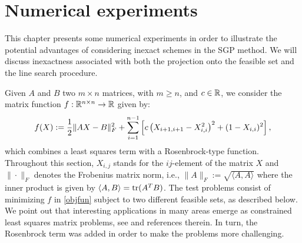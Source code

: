 \chapter{Numerical experiments} \label{chap:NumExp}
This chapter presents some numerical experiments in order to illustrate the potential advantages of considering inexact schemes in the SGP method.
We will discuss inexactness associated with both the projection onto the feasible set and the line search procedure.

Given $A$ and $B$ two $m\times n$ matrices, with $m\geq n$, and $c\in\mathbb{R}$, we consider the matrix function $f:\mathbb{R}^{n\times n}\to\mathbb{R}$ given by:
\begin{equation}\label{objfun}
	f(X):=\displaystyle\frac{1}{2}\|AX-B\|^2_F + \sum_{i=1}^{n-1} \left[ c \left( X_{i+1,i+1}-X_{i,i}^2 \right)^2 + (1-X_{i,i})^2   \right],
\end{equation}
which combines a least squares term with a Rosenbrock-type function.
Throughout this section, $X_{i,j}$ stands for the $ij$-element of the matrix $X$ and $\|\cdot\|_F$ denotes the Frobenius matrix norm, i.e., $\|A\|_F:=\sqrt{\langle A,A \rangle}$ where the inner product is given by $\langle A,B \rangle = \textrm{tr}(A^TB)$.
The test problems consist of minimizing $f$ in \eqref{objfun} subject to two different feasible sets, as described below.
We point out that interesting applications in many areas emerge as constrained least squares matrix problems, see \cite{BirginMartinezRaydan2003} and references therein.
In turn, the Rosenbrock term was added in order to make the problems more challenging.

